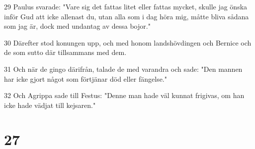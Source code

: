 \par 29 Paulus svarade: "Vare sig det fattas litet eller fattas mycket, skulle jag önska inför Gud att icke allenast du, utan alla som i dag höra mig, måtte bliva sådana som jag är, dock med undantag av dessa bojor."
\par 30 Därefter stod konungen upp, och med honom landshövdingen och Bernice och de som sutto där tillsammans med dem.
\par 31 Och när de gingo därifrån, talade de med varandra och sade: "Den mannen har icke gjort något som förtjänar död eller fängelse."
\par 32 Och Agrippa sade till Festus: "Denne man hade väl kunnat frigivas, om han icke hade vädjat till kejsaren."

\chapter{27}

